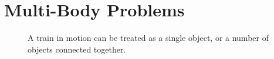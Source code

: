 \section{Multi-Body Problems}
\begin{figure}[ht]
  \centering
  \caption{A train in motion can be treated as a single object, or a number of
    objects connected together.}
\end{figure}
%
%
%
%
%
%
%
%
